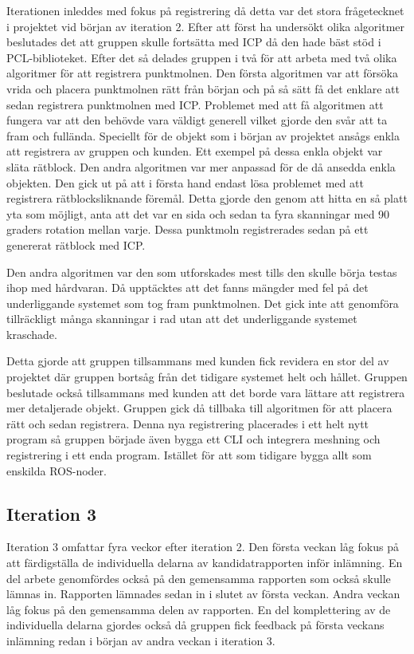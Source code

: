 Iterationen inleddes med fokus på registrering då detta var det stora frågetecknet i projektet vid början av iteration 2. Efter att först ha undersökt olika algoritmer beslutades det att gruppen skulle fortsätta med ICP då den hade bäst stöd i PCL-biblioteket. Efter det så delades gruppen i två för att arbeta med två olika algoritmer för att registrera punktmolnen. Den första algoritmen var att försöka vrida och placera punktmolnen rätt från början och på så sätt få det enklare att sedan registrera punktmolnen med ICP. Problemet med att få algoritmen att fungera var att den behövde vara väldigt generell vilket gjorde den svår att ta fram och fullända. Speciellt för de objekt som i början av projektet ansågs enkla att registrera av gruppen och kunden. Ett exempel på dessa enkla objekt var släta rätblock. Den andra algoritmen var mer anpassad för de då ansedda enkla objekten. Den gick ut på att i första hand endast lösa problemet med att registrera rätblocksliknande föremål. Detta gjorde den genom att hitta en så platt yta som möjligt, anta att det var en sida och sedan ta fyra skanningar med 90 graders rotation mellan varje. Dessa punktmoln registrerades sedan på ett genererat rätblock med ICP.

Den andra algoritmen var den som utforskades mest tills den skulle börja testas ihop med hårdvaran. Då upptäcktes att det fanns mängder med fel på det underliggande systemet som tog fram punktmolnen. Det gick inte att genomföra tillräckligt många skanningar i rad utan att det underliggande systemet kraschade.

Detta gjorde att gruppen tillsammans med kunden fick revidera en stor del av projektet där gruppen bortsåg från det tidigare systemet helt och hållet. Gruppen beslutade också tillsammans med kunden att det borde vara lättare att registrera mer detaljerade objekt. Gruppen gick då tillbaka till algoritmen för att placera rätt och sedan registrera. Denna nya registrering placerades i ett helt nytt program så gruppen började även bygga ett CLI och integrera meshning och registrering i ett enda program. Istället för att som tidigare bygga allt som enskilda ROS-noder.

\subsection{Iteration 3}

Iteration 3 omfattar fyra veckor efter iteration 2. Den första veckan låg fokus på att färdigställa de individuella delarna av kandidatrapporten inför inlämning. En del arbete genomfördes också på den gemensamma rapporten som också skulle lämnas in. Rapporten lämnades sedan in i slutet av första veckan. Andra veckan låg fokus på den gemensamma delen av rapporten. En del komplettering av de individuella delarna gjordes också då gruppen fick feedback på första veckans inlämning redan i början av andra veckan i iteration 3.

